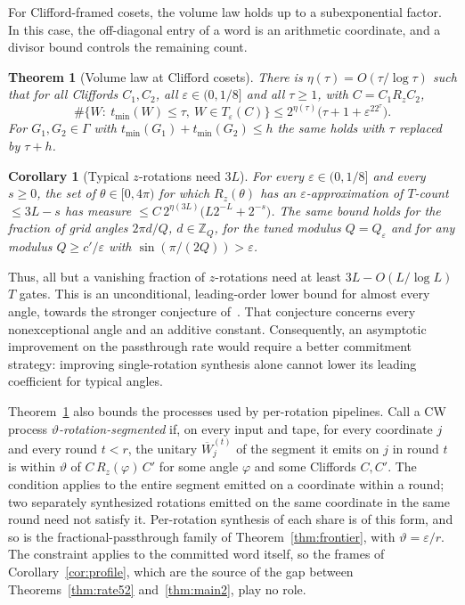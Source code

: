 \documentclass[aps,prx,twocolumn,superscriptaddress,nofootinbib,longbibliography]{revtex4-2}
\theoremstyle{plain}
\newtheorem{theorem}{Theorem}
\newtheorem{corollary}{Corollary}
\theoremstyle{definition}
\theoremstyle{remark}
\newcommand{\Z}{\mathbb{Z}}
\begin{document}
For Clifford-framed cosets, the volume law holds up to a subexponential factor. In this case, the off-diagonal entry of a word is an arithmetic coordinate, and a divisor bound controls the remaining count.


\begin{theorem}[Volume law at Clifford cosets]\label{thm:clifford}
There is $\eta(\tau)=O(\tau/\log\tau)$ such that for all Cliffords $C_1,C_2$, all $\varepsilon\in(0,1/8]$ and all $\tau\ge1$, with $C=C_1R_zC_2$,
\begin{equation}\label{eq:clifford}
\#\{W:\ t_{\min}(W)\le\tau,\ W\in T_\varepsilon(C)\}\le2^{\eta(\tau)}\big(\tau+1+\varepsilon^22^\tau\big).
\end{equation}
For $G_1,G_2\in\Gamma$ with $t_{\min}(G_1)+t_{\min}(G_2)\le h$ the same holds with $\tau$ replaced by $\tau+h$.
\end{theorem}
\begin{corollary}[Typical $z$-rotations need $3L$]\label{cor:typical}
For every $\varepsilon\in(0,1/8]$ and every $s\ge0$, the set of $\theta\in[0,4\pi)$ for which $R_z(\theta)$ has an $\varepsilon$-approximation of $T$-count $\le3L-s$ has measure $\le C\,2^{\eta(3L)}\big(L2^{-L}+2^{-s}\big)$. The same bound holds for the fraction of grid angles $2\pi d/Q$, $d\in\Z_Q$, for the tuned modulus $Q=Q_\varepsilon$ and for any modulus $Q\ge c'/\varepsilon$ with $\sin(\pi/(2Q))>\varepsilon$.
\end{corollary}
Thus, all but a vanishing fraction of $z$-rotations need at least $3L-O(L/\log L)$ $T$ gates. This is an unconditional, leading-order lower bound for almost every angle, towards the stronger conjecture of~\cite[Sec.~8.3, Conj.~1]{RossSelinger}. That conjecture concerns every nonexceptional angle and an additive constant. Consequently, an asymptotic improvement on the passthrough rate would require a better commitment strategy: improving single-rotation synthesis alone cannot lower its leading coefficient for typical angles.


Theorem~\ref{thm:clifford} also bounds the processes used by per-rotation pipelines. Call a CW process \emph{$\vartheta$-rotation-segmented} if, on every input and tape, for every coordinate $j$ and every round $t<r$, the unitary $\overline W^{(t)}_j$ of the segment it emits on $j$ in round $t$ is within $\vartheta$ of $C\,R_z(\varphi)\,C'$ for some angle $\varphi$ and some Cliffords $C,C'$. The condition applies to the entire segment emitted on a coordinate within a round; two separately synthesized rotations emitted on the same coordinate in the same round need not satisfy it. Per-rotation synthesis of each share is of this form, and so is the fractional-passthrough family of Theorem~\ref{thm:frontier}, with $\vartheta=\varepsilon/r$. The constraint applies to the committed word itself, so the frames of Corollary~\ref{cor:profile}, which are the source of the gap between Theorems~\ref{thm:rate52} and~\ref{thm:main2}, play no role.
\end{document}
